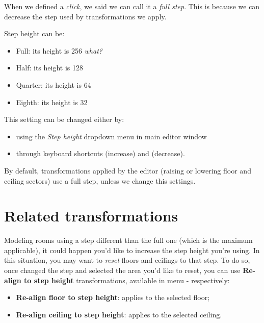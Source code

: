 When we defined a \emph{click}, we said we can call it a \emph{full step}. This is because we can decrease the step used by transformations we apply.
\par Step height can be:
\begin{itemize}
    \item Full: its height is 256 \emph{what?} %
    \item Half: its height is 128
    \item Quarter: its height is 64
    \item Eighth: its height is 32
\end{itemize}
This setting can be changed either by:
\begin{itemize}
    \item using the \emph{Step height} dropdown menu in main editor window
    \item through keyboard shortcuts  (increase) and  (decrease).
\end{itemize}
\begin{remark}
    By default, transformations applied by the editor (raising or lowering floor and ceiling sectors) use a full step, unless we change this settings.
\end{remark}

\section{Related transformations}

Modeling rooms using a step different than the full one (which is the maximum applicable), it could happen you'd like to increase the step height you're using. In this situation, you may want to \emph{reset} floors and ceilings to that step. To do so, once changed the step and selected the area you'd like to reset, you can use \textbf{Re-align to step height} transformations, available in  menu - respectively:
\begin{itemize}
    \item \textbf{Re-align floor to step height}: applies to the selected floor;
    \item \textbf{Re-align ceiling to step height}: applies to the selected ceiling.
\end{itemize}